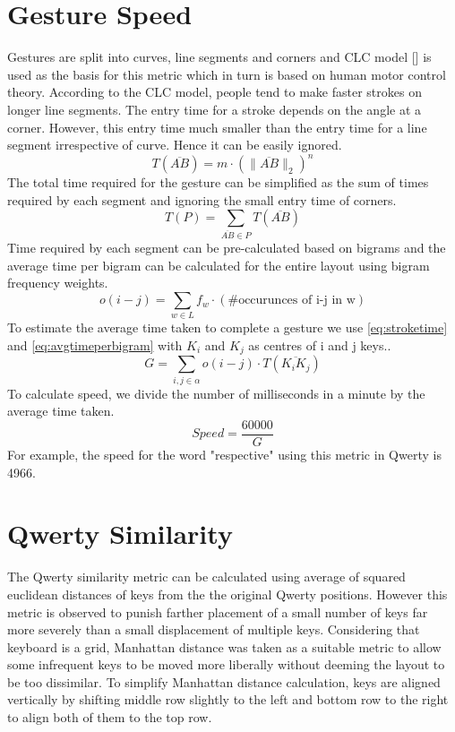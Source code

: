 \documentclass[MTech]{iitmdiss}
\begin{document}
\section{Gesture Speed}
Gestures are split into curves, line segments and corners and CLC model [\cite{strokes}] is used as the basis for this metric which in turn is based on human motor control theory. According to the CLC model, people tend to make faster strokes on longer line segments. The entry time for a stroke depends on the angle at a corner. However, this entry time much smaller than the entry time for a line segment irrespective of curve. Hence it can be easily ignored. 
\begin{equation} \label{eq:stroketime}
T( \overline{AB} )= m \cdot (\| \overline{AB} \|_{2})^n
\end{equation}
The total time required for the gesture can be simplified as the sum of times required by each segment and ignoring the small entry time of corners. 
\begin{equation} T(P)= \sum_{\overline{AB} \in P} T(\overline{AB}) \end{equation}
Time required by each segment can be pre-calculated based on bigrams and the average time per bigram can be calculated for the entire layout using bigram frequency weights.
\begin{equation} \label{eq:avgtimeperbigram} o(i-j)= \sum_{w \in L} f_{w} \cdot (\text {\# occurunces of i-j in w}) \end{equation}
To estimate the average time taken to complete a gesture we use \ref{eq:stroketime} and \ref{eq:avgtimeperbigram} with $K_{i}$ and $K_{j}$ as centres of i and j keys..
\begin{equation} G = \sum_{i,j \in \alpha} o(i-j) \cdot T(\overline{K_{i}K_{j}}) \end{equation}
To calculate speed, we divide the number of milliseconds in a minute by the average time taken.
\begin{equation}
Speed = \frac{60000}{G}
\end{equation}
For example, the speed for the word "respective" using this metric in Qwerty is 4966.

\section{Qwerty Similarity}
The Qwerty similarity metric can be calculated using average of squared euclidean distances of keys from the the original Qwerty positions. However this metric is observed to punish farther placement of a small number of keys far more severely than a small displacement of multiple keys. Considering that keyboard is a grid, Manhattan distance was taken as a suitable metric to allow some infrequent keys to be moved more liberally without deeming the layout to be too dissimilar. To simplify Manhattan distance calculation, keys are aligned vertically by shifting middle row slightly to the left and bottom row to the right to align both of them to the top row.
\end{document}
